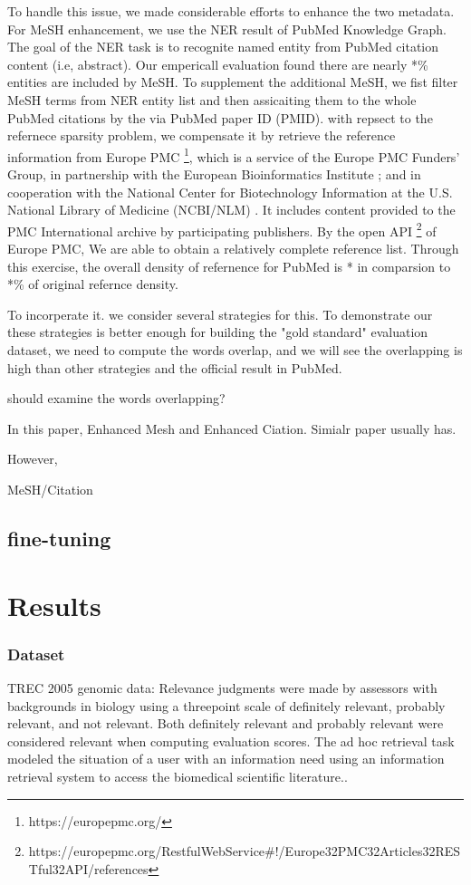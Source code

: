 \documentclass[11pt]{article}
\begin{document}
    To handle this issue, we made considerable efforts to enhance the two metadata. For MeSH enhancement, we use the NER result of PubMed Knowledge Graph\cite{xu2020building}. The goal of the NER task is to recognite named entity from PubMed citation content (i.e, abstract).
    Our empericall evaluation found there are nearly *\% entities are included by MeSH. To supplement the additional MeSH, we fist filter MeSH terms from NER entity list and then assicaiting them to the whole PubMed citations by the via PubMed paper ID (PMID).
    with repsect to the refernece sparsity problem, we compensate it by retrieve the reference information from Europe PMC \footnote{https://europepmc.org/}, which is a service of the Europe PMC Funders' Group, in partnership with the European Bioinformatics Institute ; and in cooperation with the National Center for Biotechnology Information at the U.S. National Library of Medicine (NCBI/NLM) . It includes content provided to the PMC International archive by participating publishers.
    By the open API \footnote{https://europepmc.org/RestfulWebService#!/Europe32PMC32Articles32RESTful32API/references} of Europe PMC, We are able to obtain a relatively complete reference list. Through this exercise, the overall density of refernence for PubMed is * in comparsion to *\% of original refernce density.

    To incorperate it. we consider several strategies for this.
    To demonstrate our these strategies is better enough for building the "gold standard" evaluation dataset, we need to compute the words overlap, and we will see the overlapping is high than other strategies and the official result in PubMed.

    should examine the words overlapping?

    In this paper,
    Enhanced Mesh and Enhanced Ciation. Simialr paper usually has.

    However,

    MeSH/Citation


    \subsection{fine-tuning}


    \section{Results}
    \subsubsection{Dataset}
    TREC 2005 genomic data: Relevance judgments were made by assessors with backgrounds in biology using a threepoint scale of definitely relevant, probably relevant, and not relevant. Both definitely relevant and probably
    relevant were considered relevant when computing evaluation scores. The ad hoc retrieval task modeled the situation of a user with an information need using an
    information retrieval system to access the biomedical scientific literature.\cite{Overview of TREC 2005; TREC 2005 Genomics Track Overview }.
\end{document}
